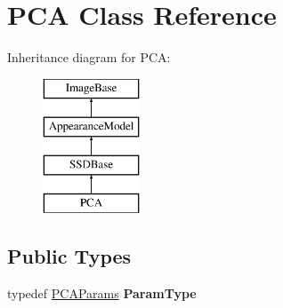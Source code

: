 \hypertarget{classPCA}{\section{P\-C\-A Class Reference}
\label{classPCA}
}
Inheritance diagram for P\-C\-A\-:\begin{figure}[H]
\begin{center}
\leavevmode
\includegraphics[height=4.000000cm]{classPCA}
\end{center}
\end{figure}
\subsection*{Public Types}
\begin{DoxyCompactItemize}
\item 
\hypertarget{classPCA_a2c672744bf8e22dcad5494be69f93a63}{typedef \hyperlink{structPCAParams}{P\-C\-A\-Params} {\bfseries Param\-Type}}\label{classPCA_a2c672744bf8e22dcad5494be69f93a63}

\end{DoxyCompactItemize}
